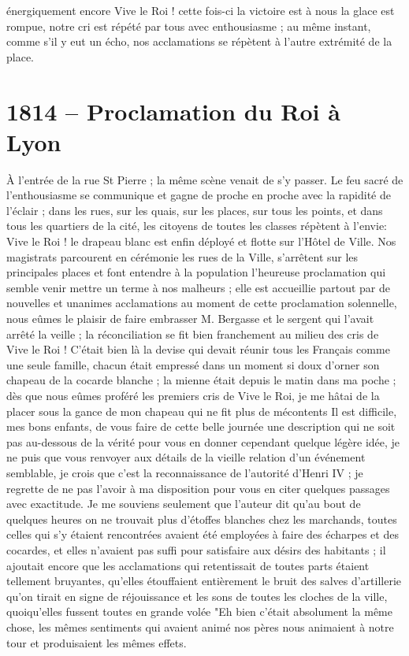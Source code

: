 \documentclass[11pt,a4paper]{report}
\begin{document}
énergiquement encore Vive le Roi ! cette fois-ci la victoire est à nous la glace est rompue, notre cri est répété par tous avec enthousiasme ; au même instant, comme s'il y eut un écho, nos acclamations se répètent à l'autre extrémité de la place.

\section*{1814 -- Proclamation du Roi à Lyon}

À l'entrée de la rue St Pierre ; la même scène venait de s'y passer. Le feu sacré de l'enthousiasme se communique et gagne de proche en proche avec la rapidité de l'éclair ; dans les rues, sur les quais, sur les places, sur tous les points, et dans tous les quartiers de la cité, les citoyens de toutes les classes répètent à l'envie: Vive le Roi ! le drapeau blanc est enfin déployé et flotte sur l'Hôtel de Ville. Nos magistrats parcourent en cérémonie les rues de la Ville, s'arrêtent sur les principales places et font entendre à la population l'heureuse proclamation qui semble venir mettre un terme à nos malheurs ; elle est accueillie partout par de nouvelles et unanimes acclamations au moment de cette proclamation solennelle, nous eûmes le plaisir de faire embrasser M. Bergasse et le sergent qui l'avait arrêté la veille ; la réconciliation se fit bien franchement au milieu des cris de Vive le Roi ! C'était bien là la devise qui devait réunir tous les Français comme une seule famille, chacun était empressé dans un moment si doux d'orner son chapeau de la cocarde blanche ; la mienne était depuis le matin dans ma poche ; dès que nous eûmes proféré les premiers cris de Vive le Roi, je me hâtai de la placer sous la gance de mon chapeau qui ne fit plus de mécontents Il est difficile, mes bons enfants, de vous faire de cette belle journée une description qui ne soit pas au-dessous de la vérité pour vous en donner cependant quelque légère idée, je ne puis que vous renvoyer aux détails de la vieille relation d'un événement semblable, je crois que c'est la reconnaissance de l'autorité d'Henri IV ; je regrette de ne pas l'avoir à ma disposition pour vous en citer quelques passages avec exactitude. Je me souviens seulement que l'auteur dit qu'au bout de quelques heures on ne trouvait plus d'étoffes blanches chez les marchands, toutes celles qui s'y étaient rencontrées avaient été employées à faire des écharpes et des cocardes, et elles n'avaient pas suffi pour satisfaire aux désirs des habitants ; il ajoutait encore que les acclamations qui retentissait de toutes parts étaient tellement bruyantes, qu'elles étouffaient entièrement le bruit des salves d'artillerie qu'on tirait en signe de réjouissance et les sons de toutes les cloches de la ville, quoiqu'elles fussent toutes en grande volée "Eh bien c'était absolument la même chose, les mêmes sentiments qui avaient animé nos pères nous animaient à notre tour et produisaient les mêmes effets.
\end{document}
